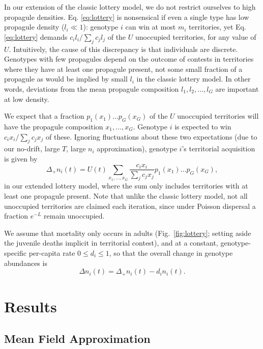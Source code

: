 \documentclass[11pt]{article}
\begin{document}
In our extension of the classic lottery model, we do not restrict ourselves to high propagule densities. Eq. \eqref{eq:lottery} is nonsensical if even a single type has low propagule density ($l_i\ll 1$): genotype $i$ can win at most $m_i$ territories, yet Eq. \eqref{eq:lottery} demands $c_i l_i/\sum_j c_j l_j$ of the $U$ unoccupied territories, for any value of $U$. Intuitively, the cause of this discrepancy is that individuals are discrete. Genotypes with few propagules depend on the outcome of contests in territories where they have at least one propagule present, not some small fraction of a propagule as would be implied by small $l_i$ in the classic lottery model. In other words, deviations from the mean propagule composition $l_1,l_2,\ldots,l_G$ are important at low density. 

We expect that a fraction $p_1(x_1)\ldots p_G(x_G)$ of the $U$ unoccupied territories will have the propagule composition $x_1,\ldots,x_G$. Genotype $i$ is expected to win $c_i x_i/\sum_j c_j x_j$ of these. Ignoring fluctuations about these two expectations (due to our no-drift, large $T$, large $n_i$ approximation), genotype $i$'s territorial acquisition is given by
\begin{equation}
\Delta_+ n_i(t)=U(t)\sum_{x_1,\ldots,x_G} \frac{c_i x_i}{\sum_j c_j x_j} p_1(x_1)\ldots p_G(x_G), \label{eq:growthsumuncoupled}
\end{equation}
in our extended lottery model, where the sum only includes territories with at least one propagule present. Note that unlike the classic lottery model, not all unoccupied territories are claimed each iteration, since under Poisson dispersal a fraction $e^{-L}$ remain unoccupied.

We assume that mortality only occurs in adults (Fig.~\ref{fig:lottery}; setting aside the juvenile deaths implicit in territorial contest), and at a constant, genotype-specific per-capita rate $0\leq d_i\leq 1$, so that the overall change in genotype abundances is
\begin{equation}
\Delta n_i(t)=\Delta_+ n_i(t)-d_i n_i(t). \label{eq:delttot}
\end{equation}

\section*{Results}

\subsection*{Mean Field Approximation}
\end{document}
